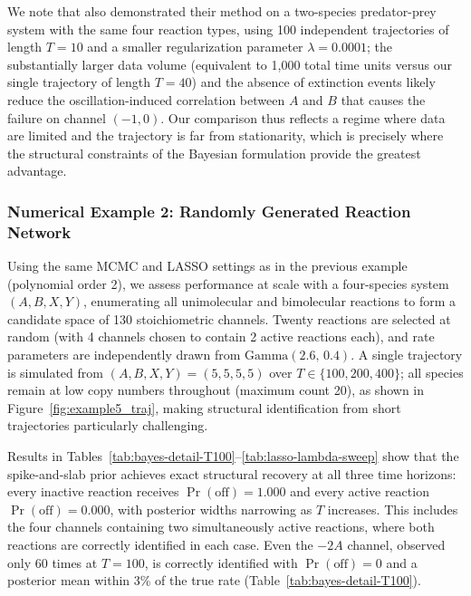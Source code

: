 We note that \cite{zhang2019learning} also demonstrated their method on a two-species predator-prey system with the same four reaction types, using 100 independent trajectories of length $T=10$ and a smaller regularization parameter $\lambda = 0.0001$; the substantially larger data volume (equivalent to 1{,}000 total time units versus our single trajectory of length $T=40$) and the absence of extinction events likely reduce the oscillation-induced correlation between $A$ and $B$ that causes the failure on channel $(-1,0)$. Our comparison thus reflects a regime where data are limited and the trajectory is far from stationarity, which is precisely where the structural constraints of the Bayesian formulation provide the greatest advantage.

\subsubsection*{Numerical Example 2: Randomly Generated Reaction Network}

Using the same MCMC and LASSO settings as in the previous example (polynomial order 2), we assess performance at scale with a four-species system $(A,B,X,Y)$, enumerating all unimolecular and bimolecular reactions to form a candidate space of 130 stoichiometric channels. Twenty reactions are selected at random (with 4 channels chosen to contain 2 active reactions each), and rate parameters are independently drawn from $\mathrm{Gamma}(2.6,\,0.4)$. A single trajectory is simulated from $(A,B,X,Y)=(5,5,5,5)$ over $T\in\{100,200,400\}$; all species remain at low copy numbers throughout (maximum count 20), as shown in Figure~\ref{fig:example5_traj}, making structural identification from short trajectories particularly challenging.

Results in Tables~\ref{tab:bayes-detail-T100}--\ref{tab:lasso-lambda-sweep} show that the spike-and-slab prior achieves exact structural recovery at all three time horizons: every inactive reaction receives $\Pr(\text{off})=1.000$ and every active reaction $\Pr(\text{off})=0.000$, with posterior widths narrowing as $T$ increases. This includes the four channels containing two simultaneously active reactions, where both reactions are correctly identified in each case. Even the $-2A$ channel, observed only 60 times at $T=100$, is correctly identified with $\Pr(\text{off})=0$ and a posterior mean within 3\% of the true rate (Table~\ref{tab:bayes-detail-T100}).

